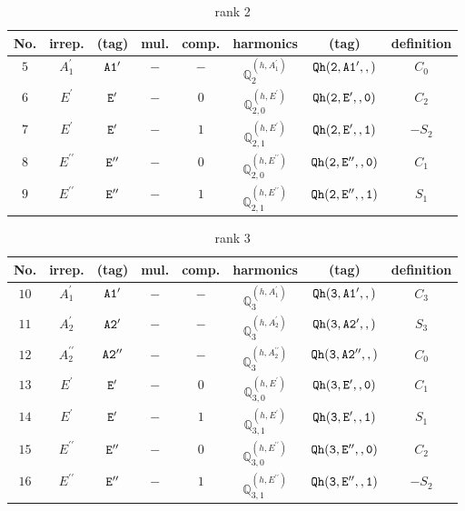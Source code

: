 \documentclass[fleqn,8pt]{jsarticle}
\begin{document}
\begin{table}[ht!]
\begin{center}
\caption{rank 2}
\renewcommand{\arraystretch}{1.3}
\begin{tabular}{cccccccc} \hline \hline
No. & irrep. & (tag) & mul. & comp. & harmonics & (tag) & definition \\ \hline
$ 5 $ & $ A_{1}^{\prime} $ & $ {\tt A1'} $ & $ - $ & $ - $ & $ \mathbb{Q}_{2}^{(h,A_{1}^{\prime})} $ & $ {\tt Qh(2,A1',,)} $ & $ C_{0} $ \\
$ 6 $ & $ E^{\prime} $ & $ {\tt E'} $ & $ - $ & $ 0 $ & $ \mathbb{Q}_{2,0}^{(h,E^{\prime})} $ & $ {\tt Qh(2,E',,0)} $ & $ C_{2} $ \\
$ 7 $ & $ E^{\prime} $ & $ {\tt E'} $ & $ - $ & $ 1 $ & $ \mathbb{Q}_{2,1}^{(h,E^{\prime})} $ & $ {\tt Qh(2,E',,1)} $ & $ - S_{2} $ \\
$ 8 $ & $ E^{\prime\prime} $ & $ {\tt E''} $ & $ - $ & $ 0 $ & $ \mathbb{Q}_{2,0}^{(h,E^{\prime\prime})} $ & $ {\tt Qh(2,E'',,0)} $ & $ C_{1} $ \\
$ 9 $ & $ E^{\prime\prime} $ & $ {\tt E''} $ & $ - $ & $ 1 $ & $ \mathbb{Q}_{2,1}^{(h,E^{\prime\prime})} $ & $ {\tt Qh(2,E'',,1)} $ & $ S_{1} $ \\
 \hline \hline
\end{tabular}
\end{center}
\end{table}
\begin{table}[ht!]
\begin{center}
\caption{rank 3}
\renewcommand{\arraystretch}{1.3}
\begin{tabular}{cccccccc} \hline \hline
No. & irrep. & (tag) & mul. & comp. & harmonics & (tag) & definition \\ \hline
$ 10 $ & $ A_{1}^{\prime} $ & $ {\tt A1'} $ & $ - $ & $ - $ & $ \mathbb{Q}_{3}^{(h,A_{1}^{\prime})} $ & $ {\tt Qh(3,A1',,)} $ & $ C_{3} $ \\
$ 11 $ & $ A_{2}^{\prime} $ & $ {\tt A2'} $ & $ - $ & $ - $ & $ \mathbb{Q}_{3}^{(h,A_{2}^{\prime})} $ & $ {\tt Qh(3,A2',,)} $ & $ S_{3} $ \\
$ 12 $ & $ A_{2}^{\prime\prime} $ & $ {\tt A2''} $ & $ - $ & $ - $ & $ \mathbb{Q}_{3}^{(h,A_{2}^{\prime\prime})} $ & $ {\tt Qh(3,A2'',,)} $ & $ C_{0} $ \\
$ 13 $ & $ E^{\prime} $ & $ {\tt E'} $ & $ - $ & $ 0 $ & $ \mathbb{Q}_{3,0}^{(h,E^{\prime})} $ & $ {\tt Qh(3,E',,0)} $ & $ C_{1} $ \\
$ 14 $ & $ E^{\prime} $ & $ {\tt E'} $ & $ - $ & $ 1 $ & $ \mathbb{Q}_{3,1}^{(h,E^{\prime})} $ & $ {\tt Qh(3,E',,1)} $ & $ S_{1} $ \\
$ 15 $ & $ E^{\prime\prime} $ & $ {\tt E''} $ & $ - $ & $ 0 $ & $ \mathbb{Q}_{3,0}^{(h,E^{\prime\prime})} $ & $ {\tt Qh(3,E'',,0)} $ & $ C_{2} $ \\
$ 16 $ & $ E^{\prime\prime} $ & $ {\tt E''} $ & $ - $ & $ 1 $ & $ \mathbb{Q}_{3,1}^{(h,E^{\prime\prime})} $ & $ {\tt Qh(3,E'',,1)} $ & $ - S_{2} $ \\
 \hline \hline
\end{tabular}
\end{center}
\end{table}
\end{document}
